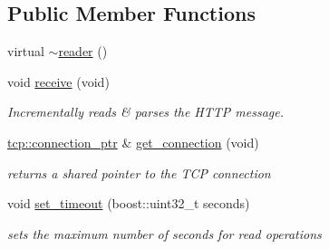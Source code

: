 \subsection*{Public Member Functions}
\begin{DoxyCompactItemize}
\item 
virtual \hyperlink{classpion_1_1http_1_1reader_a12daedec9fab5978a06d548d86ddfcf7}{$\sim$reader} ()
\item 
void \hyperlink{classpion_1_1http_1_1reader_af9f883cb767252fb9976e229e68f20ea}{receive} (void)
\begin{DoxyCompactList}\small\item\em Incrementally reads \& parses the H\-T\-T\-P message. \end{DoxyCompactList}\item 
\hyperlink{namespacepion_1_1tcp_a6c9b7497068009f6d81d95ec0b0627d6}{tcp\-::connection\-\_\-ptr} \& \hyperlink{classpion_1_1http_1_1reader_a6df8c9dd8f6587b49eb54ce4f7ace431}{get\-\_\-connection} (void)
\begin{DoxyCompactList}\small\item\em returns a shared pointer to the T\-C\-P connection \end{DoxyCompactList}\item 
void \hyperlink{classpion_1_1http_1_1reader_aabe13844673a420869d0e0fe31e198ad}{set\-\_\-timeout} (boost\-::uint32\-\_\-t seconds)
\begin{DoxyCompactList}\small\item\em sets the maximum number of seconds for read operations \end{DoxyCompactList}\end{DoxyCompactItemize}
